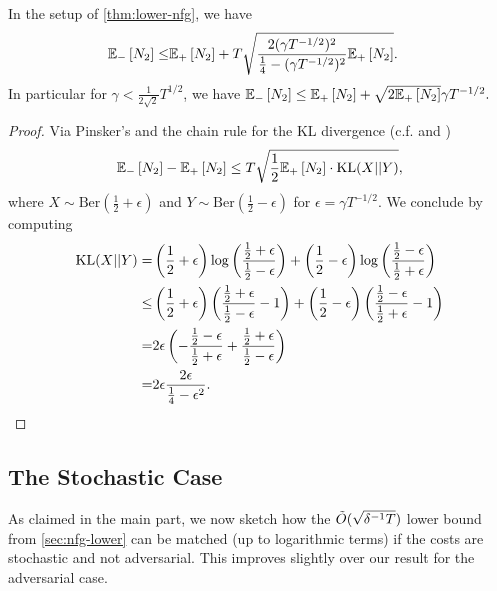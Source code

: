 \begin{lemma} \label{lemma:pinsker-nfg}
    In the setup of \cref{thm:lower-nfg}, we have
    \begin{align*}
        \mathbb{E}_{-}\left[ N_2 \right]
        \leq& \mathbb{E}_{+}\left[ N_2 \right] + T\sqrt{\frac{2(\gamma T^{-1/2})^2}{\frac{1}{4}-(\gamma T^{-1/2})^2}\mathbb{E}_{+}\left[ N_2 \right]}.
    \end{align*}
    In particular for $\gamma < \frac{1}{2\sqrt{2}} T^{1/2}$, we have $\mathbb{E}_{-}\left[ N_2 \right]
        \leq \mathbb{E}_{+}\left[ N_2 \right] + \sqrt{2\mathbb{E}_{+}\left[ N_2 \right]}\gamma T^{-1/2}.$
\end{lemma}

\begin{proof}
    Via Pinsker's and the chain rule for the KL divergence (c.f. \citet{auer1995gambling} and \citet[Appendix]{lattimore2015pareto})
    \begin{align*}
        \mathbb{E}_{-}\left[ N_2 \right] - \mathbb{E}_{+}\left[ N_2 \right] \leq T \sqrt{\frac{1}{2} \mathbb{E}_{+}\left[ N_2 \right] \cdot\text{KL}(X||Y)},
    \end{align*}
    where $X\sim \text{Ber}(\frac{1}{2}+\epsilon)$ and $Y\sim \text{Ber}(\frac{1}{2}-\epsilon)$ for $\epsilon=\gamma T^{-1/2}$. We conclude by computing 
    \begin{align*}
        \text{KL}(X||Y) =& \left( \frac{1}{2}+\epsilon \right)\log\left( \frac{\frac{1}{2}+\epsilon}{\frac{1}{2}-\epsilon} \right) + \left( \frac{1}{2}-\epsilon \right)\log\left( \frac{\frac{1}{2}-\epsilon}{\frac{1}{2}+\epsilon} \right)\\
        \leq& \left( \frac{1}{2}+\epsilon \right)\left( \frac{\frac{1}{2}+\epsilon}{\frac{1}{2}-\epsilon}-1 \right) + \left( \frac{1}{2}-\epsilon \right)\left( \frac{\frac{1}{2}-\epsilon}{\frac{1}{2}+\epsilon}-1 \right)\\
        =& 2\epsilon \left( - \frac{\frac{1}{2}-\epsilon}{\frac{1}{2}+\epsilon}+\frac{\frac{1}{2}+\epsilon}{\frac{1}{2}-\epsilon} \right)\\
        =& 2\epsilon \frac{2\epsilon}{\frac{1}{4}-\epsilon^2}.
    \end{align*}
\end{proof}


\subsection{The Stochastic Case} \label{app:nfg-stochastic}



As claimed in the main part, we now sketch how the $\tilde{O}(\sqrt{\delta^{-1}T})$ lower bound from \cref{sec:nfg-lower} can be matched (up to logarithmic terms) if the costs are stochastic and not adversarial. This improves slightly over our result for the adversarial case.


